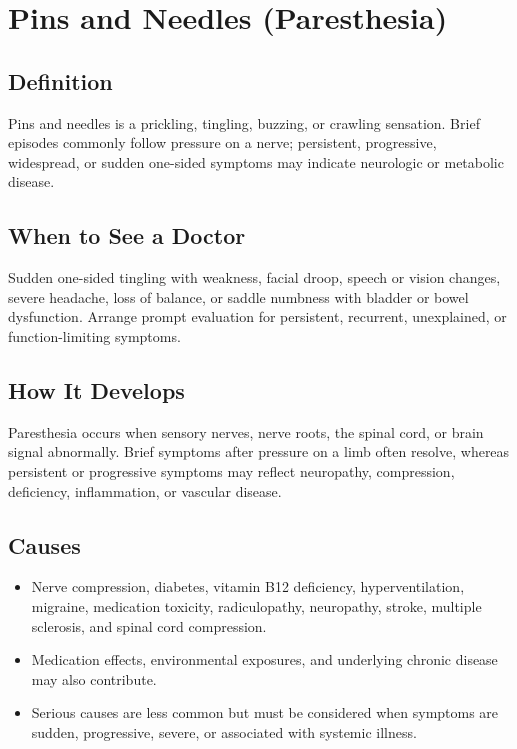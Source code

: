 \chapter{Pins and Needles (Paresthesia)}

\section*{Definition}
Pins and needles is a prickling, tingling, buzzing, or crawling sensation. Brief episodes commonly follow pressure on a nerve; persistent, progressive, widespread, or sudden one-sided symptoms may indicate neurologic or metabolic disease.

\section*{When to See a Doctor}
Sudden one-sided tingling with weakness, facial droop, speech or vision changes, severe headache, loss of balance, or saddle numbness with bladder or bowel dysfunction. Arrange prompt evaluation for persistent, recurrent, unexplained, or function-limiting symptoms.

\section*{How It Develops}
Paresthesia occurs when sensory nerves, nerve roots, the spinal cord, or brain signal abnormally. Brief symptoms after pressure on a limb often resolve, whereas persistent or progressive symptoms may reflect neuropathy, compression, deficiency, inflammation, or vascular disease.

\section*{Causes}
\begin{itemize}
  \item Nerve compression, diabetes, vitamin B12 deficiency, hyperventilation, migraine, medication toxicity, radiculopathy, neuropathy, stroke, multiple sclerosis, and spinal cord compression.
  \item Medication effects, environmental exposures, and underlying chronic disease may also contribute.
  \item Serious causes are less common but must be considered when symptoms are sudden, progressive, severe, or associated with systemic illness.
\end{itemize}

